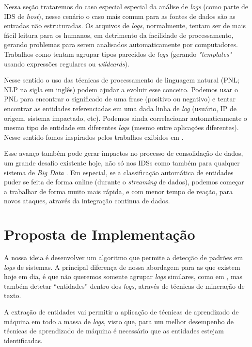 \documentclass[
	12pt,				%
	openright,			%
	twoside,			%
	a4paper,			%
	english,			%
	french,				%
	spanish,			%
	brazil,				%
	]{abntex2}
\begin{document}
Nessa seção trataremos do caso especial especial da análise de \emph{logs} (como parte de IDS de \emph{host}), nesse cenário o caso mais comum para as fontes de dados são as entradas não estruturadas. Os arquivos de \emph{logs}, normalmente, tentam ser de mais fácil leitura para os humanos, em detrimento da facilidade de processamento, gerando problemas para serem analisados automaticamente por computadores. Trabalhos como \cite{vaarandi2003data, nagappan2010abstracting} tentam agrupar tipos parecidos de \emph{logs} (gerando \emph{"templates"} usando expressões regulares ou \emph{wildcards}).

Nesse sentido o uso das técnicas de processamento de linguagem natural (PNL; NLP na sigla em inglês) podem ajudar a evoluir esse conceito. Podemos usar o PNL para encontrar o significado de uma frase (positivo ou negativo) e tentar encontrar as entidades referenciadas em uma dada linha de \emph{log} (usuário, IP de origem, sistema impactado, etc). Podemos ainda correlacionar automaticamente o mesmo tipo de entidade em diferentes \emph{logs} (mesmo entre aplicações diferentes).  Nesse sentido fomos inspirados pelos trabalhos exibidos em \cite{matos2010environment, duque2012processo}.

Esse avanço também pode gerar impactos no processo de consolidação de dados, um grande desafio existente hoje, não só nos IDSs como também para qualquer sistema de \emph{Big Data} \cite{zuech2015intrusion}. Em especial, se a classificação automática de entidades puder se feita de forma online (durante o  \emph{streaming} de dados), podemos começar a trabalhar de forma muito mais rápida, e com menor tempo de reação, para novos ataques, através da integração continua de dados.

\section{Proposta de Implementação}\label{sec:implementacao}

A nossa ideia é desenvolver um algoritmo que permite a detecção de padrões em \emph{logs} de sistemas. A principal diferença de nossa abordagem para as que existem hoje em dia, é que não queremos somente agrupar \emph{logs} similares, como em \cite{vaarandi2003data}, mas também detetar ``entidades'' dentro dos \emph{logs}, através de técnicas de mineração de texto.

A extração de entidades vai permitir a aplicação de técnicas de aprendizado de máquina em todo a massa de \emph{logs}, visto que, para um melhor desempenho de técnicas de aprendizado de máquina é necessário que as entidades estejam identificadas.
\end{document}
